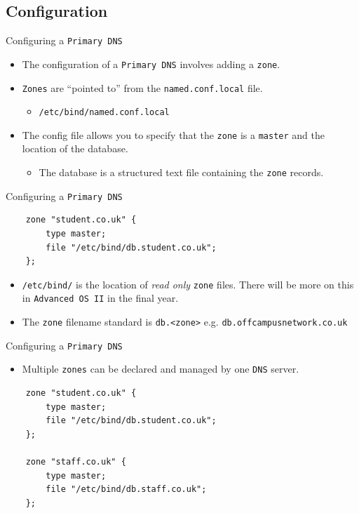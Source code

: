 \documentclass[xcolor=table]{beamer}
\begin{document}
\subsection{Configuration}
\begin{frame}{Configuring a \texttt{Primary DNS}}
  \begin{itemize}
    \item The configuration of a \texttt{Primary DNS} involves adding a \texttt{zone}.
    \item \texttt{Zones} are ``pointed to'' from the \texttt{named.conf.local} file.
      \begin{itemize}
        \item \texttt{/etc/bind/named.conf.local}
      \end{itemize}
    \item The config file allows you to specify that the \texttt{zone} is a \texttt{master} and the location of the database.
      \begin{itemize}
        \item The database is a structured text file containing the \texttt{zone} records.
      \end{itemize}
  \end{itemize}
\end{frame}

\begin{frame}[fragile]{Configuring a \texttt{Primary DNS}}
  \lstset{
    basicstyle=\small\ttfamily,
  }
  \begin{lstlisting}
    zone "student.co.uk" {
	    type master;
	    file "/etc/bind/db.student.co.uk";
    };
  \end{lstlisting}
  \begin{tcolorbox}[title={\textbf{NOTE:}}]
    \begin{itemize}
      \item \texttt{/etc/bind/} is the location of \textit{read only} \texttt{zone} files. There will be more on this in \texttt{Advanced OS II} in the final year.
      \item The \texttt{zone} filename standard is \texttt{db.<zone>} e.g. \texttt{db.offcampusnetwork.co.uk} 
    \end{itemize}
  \end{tcolorbox}
\end{frame}

\begin{frame}[fragile]{Configuring a \texttt{Primary DNS}}
  \begin{itemize}
    \item Multiple \texttt{zones} can be declared and managed by one \texttt{DNS} server. 
  \end{itemize}
\lstset{
    basicstyle=\small\ttfamily,
  }
  \begin{lstlisting}
    zone "student.co.uk" {
	    type master;
	    file "/etc/bind/db.student.co.uk";
    };

    zone "staff.co.uk" {
	    type master;
	    file "/etc/bind/db.staff.co.uk";
    };
  \end{lstlisting}
\end{frame}
\end{document}

